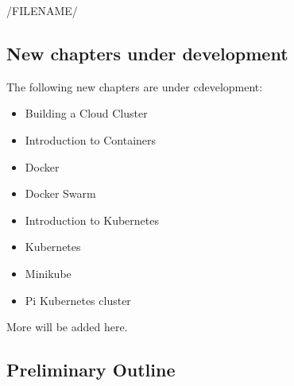 /FILENAME/

\subsection{New chapters under
development}\label{new-chapters-under-development}

The following new chapters are under cdevelopment:

\begin{itemize}
\item Building a Cloud Cluster
\item Introduction to Containers
\item Docker
\item Docker Swarm
\item Introduction to Kubernetes
\item Kubernetes
\item Minikube
\item Pi Kubernetes cluster
\end{itemize}

More will be added here.

\subsection{Preliminary Outline}\label{preliminary-outline}

